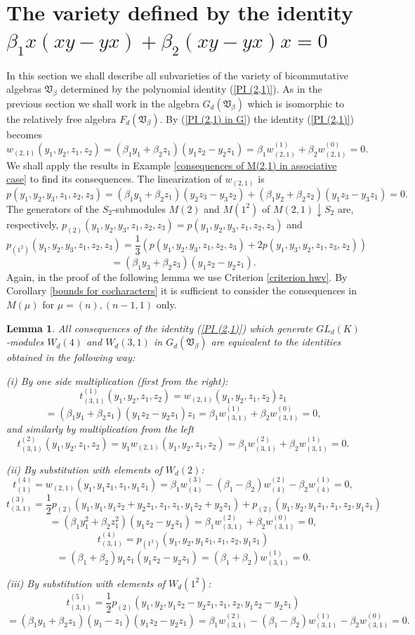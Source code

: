 \documentclass{amsart}
\newtheorem{lemma}[theorem]{Lemma}
\theoremstyle{definition}
\begin{document}
\section{The variety defined by the identity $\beta_1x(xy-yx)+\beta_2(xy-yx)x=0$}

In this section we shall describe all subvarieties of the variety of bicommutative algebras ${\mathfrak V}_{\beta}$ determined by the polynomial identity (\ref{PI (2,1)}).
As in the previous section we shall work in the algebra $G_d({\mathfrak V}_{\beta})$ which is isomorphic to the relatively free algebra $F_d({\mathfrak V}_{\beta})$.
By (\ref{PI (2,1) in G}) the identity (\ref{PI (2,1)}) becomes
\[
w_{(2,1)}(y_1,y_2,z_1,z_2)=(\beta_1y_1+\beta_2z_1)(y_1z_2-y_2z_1)=\beta_1w_{(2,1)}^{(1)}+\beta_2w_{(2,1)}^{(0)}=0.
\]
We shall apply the results in Example \ref{consequences of M(2,1) in associative case} to find its consequences.
The linearization of $w_{(2,1)}$ is
\[
p(y_1,y_2,y_3,z_1,z_2,z_3)=(\beta_1y_1+\beta_2z_1)(y_2z_3-y_3z_2)+(\beta_1y_2+\beta_2z_2)(y_1z_3-y_3z_1)=0.
\]
The generators of the $S_2$-submodules $M(2)$ and $M(1^2)$ of $M(2,1)\downarrow S_2$ are, respectively,
$p_{(2)}(y_1,y_2,y_3,z_1,z_2,z_3)=p(y_1,y_2,y_3,z_1,z_2,z_3)$ and
\[
p_{(1^2)}(y_1,y_2,y_3,z_1,z_2,z_3)=\frac{1}{3}(p(y_1,y_2,y_3,z_1,z_2,z_3)+2p(y_1,y_3,y_2,z_1,z_3,z_2))
\]
\[
=(\beta_1y_3+\beta_2z_3)(y_1z_2-y_2z_1).
\]
Again, in the proof of the following lemma we use Criterion \ref{criterion hwv}.
By Corollary \ref{bounds for cocharacters} it is sufficient to consider the consequences in $M(\mu)$ for $\mu=(n),(n-1,1)$ only.

\begin{lemma}\label{consequences of M(2,1) in G}
All consequences of the identity {\rm (\ref{PI (2,1)})} which generate $GL_d(K)$-modules $W_d(4)$ and $W_d(3,1)$ in $G_d({\mathfrak V}_{\beta})$
are equivalent to the identities obtained in the following way:

{\rm (i)} By one side multiplication (first from the right):
\[
t^{(1)}_{(3,1)}(y_1,y_2,z_1,z_2)=w_{(2,1)}(y_1,y_2,z_1,z_2)z_1
\]
\[
=(\beta_1y_1+\beta_2z_1)(y_1z_2-y_2z_1)z_1=\beta_1w_{(3,1)}^{(1)}+\beta_2w_{(3,1)}^{(0)}=0,
\]
and similarly by multiplication from the left
\[
t^{(2)}_{(3,1)}(y_1,y_2,z_1,z_2)=y_1w_{(2,1)}(y_1,y_2,z_1,z_2)=\beta_1w_{(3,1)}^{(2)}+\beta_2w_{(3,1)}^{(1)}=0.
\]

{\rm (ii)} By substitution with elements of $W_d(2)$:
\[
t^{(4)}_{(1)}=w_{(2,1)}(y_1,y_1z_1,z_1,y_1z_1)=\beta_1w_{(4)}^{(3)}-(\beta_1-\beta_2)w_{(4)}^{(2)}-\beta_2w_{(4)}^{(1)}=0,
\]
\[
t^{(3)}_{(3,1)}=\frac{1}{2}p_{(2)}(y_1,y_1,y_1z_2+y_2z_1,z_1,z_1,y_1z_2+y_2z_1)+p_{(2)}(y_1,y_2,y_1z_1,z_1,z_2,y_1z_1)
\]
\[
=(\beta_1y_1^2+\beta_2z_1^2)(y_1z_2-y_2z_1)=\beta_1w^{(2)}_{(3,1)}+\beta_2w^{(0)}_{(3,1)}=0,
\]
\[
t^{(4)}_{(3,1)}=p_{(1^2)}(y_1,y_2,y_1z_1,z_1,z_2,y_1z_1)
\]
\[
=(\beta_1+\beta_2)y_1z_1(y_1z_2-y_2z_1)=(\beta_1+\beta_2)w^{(1)}_{(3,1)}=0.
\]

{\rm (iii)} By substitution with elements of $W_d(1^2)$:
\[
t^{(5)}_{(3,1)}=\frac{1}{2}p_{(2)}(y_1,y_2,y_1z_2-y_2z_1,z_1,z_2,y_1z_2-y_2z_1)
\]
\[
=(\beta_1y_1+\beta_2z_1)(y_1-z_1)(y_1z_2-y_2z_1)=\beta_1w^{(2)}_{(3,1)}-(\beta_1-\beta_2)w^{(1)}_{(3,1)}-\beta_2w^{(0)}_{(3,1)}=0.
\]
\end{lemma}
\end{document}
